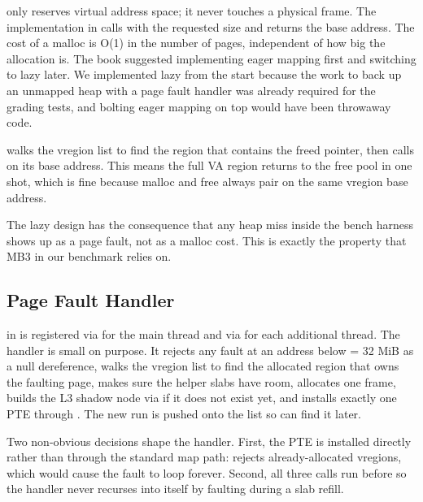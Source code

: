  only reserves virtual address space; it never touches a
physical frame. The implementation in 
calls  with the requested size and returns the base address. The cost of a malloc is O(1)
in the number of pages, independent of how big the allocation is. The book
suggested implementing eager mapping first and switching to lazy later. We
implemented lazy from the start because the work to back up an unmapped
heap with a page fault handler was already required for the grading tests,
and bolting eager mapping on top would have been throwaway code.

\medskip\noindent
{} walks the vregion list to find the region that contains the
freed pointer, then calls  on its base address. This means the
full VA region returns to the free pool in one shot, which is fine because
malloc and free always pair on the same vregion base address.

\medskip\noindent
The lazy design has the consequence that any heap miss inside the bench
harness shows up as a page fault, not as a malloc cost. This is exactly the
property that MB3 in our benchmark relies on.

\subsection{Page Fault Handler}

 in  is registered via
 for the main thread and via 
for each additional thread. The handler is small on purpose. It rejects any
fault at an address below  = 32 MiB as a null dereference,
walks the vregion list to find the allocated region that owns the faulting
page, makes sure the helper slabs have room, allocates one 
frame, builds the L3 shadow node via  if it does not exist yet,
and installs exactly one PTE through . The new run is pushed onto
the  list so  can find it later.

\medskip\noindent
Two non-obvious decisions shape the handler. First, the PTE is installed
directly rather than through the standard map path:
 rejects already-allocated vregions, which
would cause the fault to loop forever. Second, all three 
calls run before  so the handler never recurses into itself
by faulting during a slab refill.

